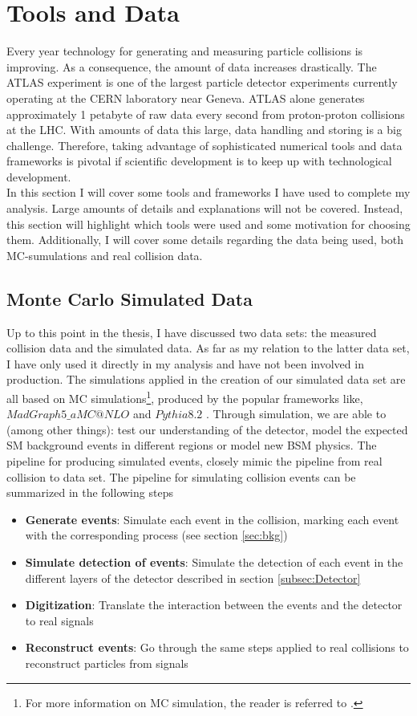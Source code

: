 \section{Tools and Data}
Every year technology for generating and measuring particle collisions is improving. 
As a consequence, the amount of data increases drastically. The ATLAS experiment
is one of the largest particle detector experiments currently operating at the 
CERN laboratory near Geneva. ATLAS alone generates approximately 1 petabyte of raw
data every second from proton-proton collisions at the \ac{LHC}. 
With amounts of data this large, data handling and storing is a big challenge. 
Therefore, taking advantage of sophisticated numerical tools and data frameworks is
pivotal if scientific development is to keep up with technological development.
\\
In this section I will cover some tools and frameworks I have used to 
complete my analysis. Large amounts of details and explanations will not be covered. 
Instead, this section will highlight which tools were used and some motivation
for choosing them. Additionally, I will cover some details regarding the data
being used, both \ac{MC}-sumulations and real collision data.
\subsection{Monte Carlo Simulated Data}
Up to this point in the thesis, I have discussed two data sets: the measured collision data and the simulated data. 
As far as my relation to the latter data set, I have only used it directly in my analysis and have not been involved in 
production. The simulations applied in the creation of our simulated data set are all based on \acf{MC} simulations\footnote{For 
more information on \ac{MC} simulation, the reader is referred to \cite{raychaudhuri_introduction_2008}.}, produced 
by the popular frameworks like, \emph{$MadGraph5\_aMC@NLO$} and \emph{$Pythia 8.2$} \cite{alwall_automated_2014, sjostrand_introduction_2015}. 
Through simulation, we are able to (among other things): test our understanding of the detector, model the expected \ac{SM} background 
events in different regions or model new \ac{BSM} physics. The pipeline for producing simulated events, closely mimic the pipeline 
from real collision to data set. The pipeline for simulating collision events can be summarized in the following steps
\begin{itemize}
  \item \textbf{Generate events}: Simulate each event in the collision, marking each event with the corresponding process (see section \ref{sec:bkg})
  \item \textbf{Simulate detection of events}: Simulate the detection of each event in the different layers of the detector described in section \ref{subsec:Detector}
  \item \textbf{Digitization}: Translate the interaction between the events and the detector to real signals
  \item \textbf{Reconstruct events}: Go through the same steps applied to real collisions to reconstruct particles from signals
\end{itemize}
